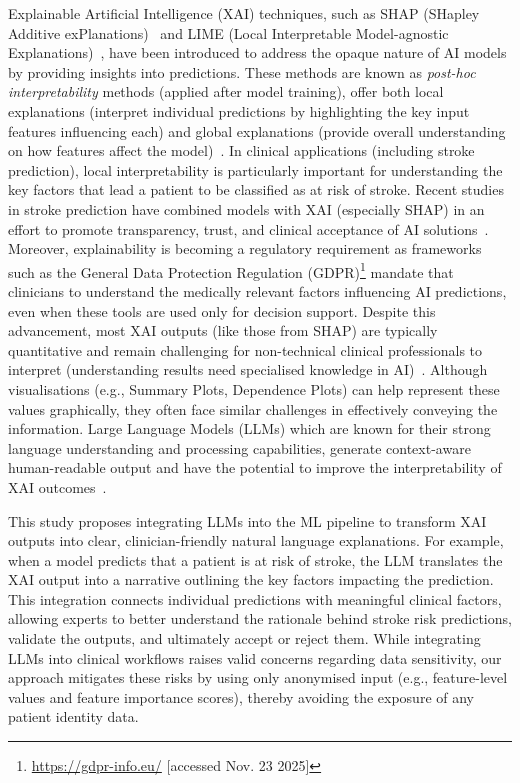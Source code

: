 \medskip 
Explainable Artificial Intelligence (XAI) techniques, such as SHAP (SHapley Additive exPlanations)~\cite{lundberg2017unified} and LIME (Local Interpretable Model-agnostic Explanations)~\cite{ribeiro2016should}, have been introduced to address the opaque nature of AI models by providing insights into predictions. These methods are known as \textit{post-hoc interpretability} methods (applied after model training), offer both local explanations (interpret individual predictions by highlighting the key input features influencing each) and global explanations (provide overall understanding on how features affect the model)~\cite{samek2019towards}. In clinical applications (including stroke prediction), local interpretability is particularly important for understanding the key factors that lead a patient to be classified as at risk of stroke. Recent studies in stroke prediction have combined models with XAI (especially SHAP) in an effort to promote transparency, trust, and clinical acceptance of AI solutions~\cite{l7, lee2023interpretable, l8, l9, l15, l10, l11, l12, l23, l13, l14, l6}. Moreover, explainability is becoming a regulatory requirement as frameworks such as the General Data Protection Regulation (GDPR)\footnote{\url{https://gdpr-info.eu/} [accessed Nov. 23 2025]} mandate that clinicians to understand the medically relevant factors influencing AI predictions, even when these tools are used only for decision support. Despite this advancement, most XAI outputs (like those from SHAP) are typically quantitative and remain challenging for non-technical clinical professionals to interpret (understanding results need specialised knowledge in AI)~\cite{l6}. Although visualisations (e.g., Summary Plots, Dependence Plots) can help represent these values graphically, they often face similar challenges in effectively conveying the information. Large Language Models (LLMs) which are known for their strong language understanding and processing capabilities, generate context-aware human-readable output and have the potential to improve the interpretability of XAI outcomes~\cite{zeng2024enhancing}.


\medskip 
This study proposes integrating LLMs into the ML pipeline to transform XAI outputs into clear, clinician-friendly natural language explanations. For example, when a model predicts that a patient is at risk of stroke, the LLM translates the XAI output into a narrative outlining the key factors impacting the prediction. This integration connects individual predictions with meaningful clinical factors, allowing experts to better understand the rationale behind stroke risk predictions, validate the outputs, and ultimately accept or reject them. While integrating LLMs into clinical workflows raises valid concerns regarding data sensitivity, our approach mitigates these risks by using only anonymised input (e.g., feature-level values and feature importance scores), thereby avoiding the exposure of any patient identity data.


